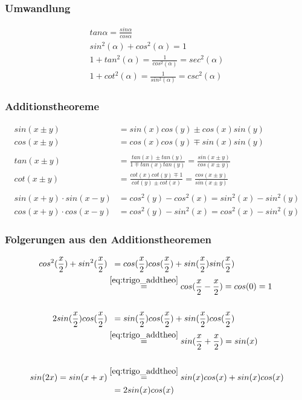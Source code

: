 \documentclass[12pt,a4paper]{article}%
\numberwithin{equation}{section}
\numberwithin{equation}{subsection}
\begin{document}
	  \subsubsection{Umwandlung}
	  \begin{align}
	    tan\alpha = \frac{sin\alpha}{cos\alpha}\\
	    sin^2(\alpha) + cos^2(\alpha) = 1\\
	    1 + tan^2(\alpha) = \frac{1}{cos^2(\alpha)} = sec^2(\alpha)\\
	    1 + cot^2(\alpha) = \frac{1}{sin^2(\alpha)} = csc^2(\alpha)\label{eq:trigo_umwandlung}
	  \end{align}
	  
	  \subsubsection{Additionstheoreme}
	  \begin{align}
	    sin(x \pm y) &= sin(x) cos(y) \pm cos(x) sin(y)\\
	    cos(x \pm y) &= cos(x) cos(y) \mp sin(x) sin(y)\\\\
	    tan(x \pm y) &= \frac{tan(x) \pm tan(y)}{1 \mp tan(x) tan(y)} = \frac{sin(x \pm y)}{cos(x \pm y)}\\
	    cot(x \pm y) &= \frac{cot(x) cot(y) \mp 1}{cot(y) \pm cot(x)} = \frac{cos(x \pm y)}{sin(x \pm y)}\\\\
	    sin(x + y) \cdot sin(x - y) &= cos^2(y) - cos^2(x) = sin^2(x) - sin^2(y)\\
	    cos(x + y) \cdot cos(x - y) &= cos^2(y) - sin^2(x) = cos^2(x) - sin^2(y)\label{eq:trigo_addtheo}
	  \end{align}
	  
	  \subsubsection{Folgerungen aus den Additionstheoremen}
	  \begin{align}
	  cos^2(\frac{x}{2}) + sin^2(\frac{x}{2}) &\;\;= cos(\frac{x}{2}) cos(\frac{x}{2}) + sin(\frac{x}{2}) sin(\frac{x}{2})\\ 
	  &\overset{\eqref{eq:trigo_addtheo}}{=} cos(\frac{x}{2}-\frac{x}{2}) = cos(0) = 1\\
	  \\
	  2sin(\frac{x}{2})cos(\frac{x}{2}) &\;\;= sin(\frac{x}{2})cos(\frac{x}{2}) + sin(\frac{x}{2})cos(\frac{x}{2})\\
	  &\overset{\eqref{eq:trigo_addtheo}}{=} sin(\frac{x}{2}+ \frac{x}{2}) = sin(x)\\
	  \\
	  sin(2x) = sin(x+x) &\overset{\eqref{eq:trigo_addtheo}}{=} sin(x)cos(x) + sin(x)cos(x) \\
	  &\;\;=2sin(x)cos(x) \label{eq:trigo:addtheo_folg}
	  \end{align}
\end{document}
